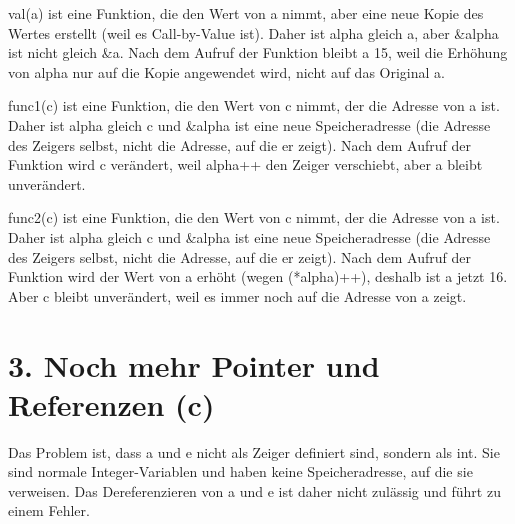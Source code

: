 \documentclass{article}
\begin{document}
\vspace*{0.5cm}

val(a) ist eine Funktion, die den Wert von a nimmt, aber eine neue Kopie des Wertes erstellt (weil es Call-by-Value ist). Daher ist alpha gleich a, aber \&alpha ist nicht gleich \&a. Nach dem Aufruf der Funktion bleibt a 15, weil die Erhöhung von alpha nur auf die Kopie angewendet wird, nicht auf das Original a.

\vspace*{0.5cm}

func1(c) ist eine Funktion, die den Wert von c nimmt, der die Adresse von a ist. Daher ist alpha gleich c und \&alpha ist eine neue Speicheradresse (die Adresse des Zeigers selbst, nicht die Adresse, auf die er zeigt). Nach dem Aufruf der Funktion wird c verändert, weil alpha++ den Zeiger verschiebt, aber a bleibt unverändert.

\vspace*{0.5cm}

func2(c) ist eine Funktion, die den Wert von c nimmt, der die Adresse von a ist. Daher ist alpha gleich c und \&alpha ist eine neue Speicheradresse (die Adresse des Zeigers selbst, nicht die Adresse, auf die er zeigt). Nach dem Aufruf der Funktion wird der Wert von a erhöht (wegen (*alpha)++), deshalb ist a jetzt 16. Aber c bleibt unverändert, weil es immer noch auf die Adresse von a zeigt.

\section*{3. Noch mehr Pointer und Referenzen (c)}

Das Problem ist, dass a und e nicht als Zeiger definiert sind, sondern als int. Sie sind normale Integer-Variablen und haben keine Speicheradresse, auf die sie verweisen. Das Dereferenzieren von a und e ist daher nicht zulässig und führt zu einem Fehler.
\end{document}
